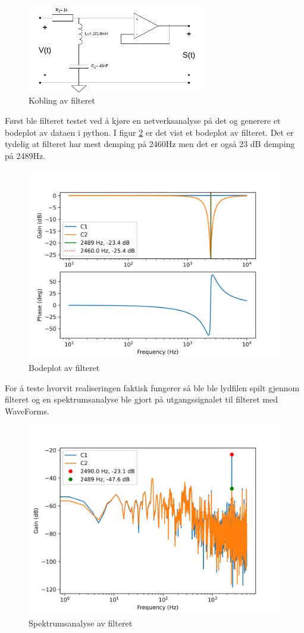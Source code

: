 \begin{figure}[!h]
	\centering
	\includegraphics[width=0.7\textwidth]{Bilder/RLC_filter.drawio.png}
	\caption{Kobling av filteret}
	\label{fig:fig5}
\end{figure}


Først ble filteret testet ved å kjøre en netverksanalyse på det og generere et bodeplot av dataen i python. I figur \ref{fig:fig6} er det vist et bodeplot av filteret. Det er tydelig at filteret har mest demping på 2460Hz men det er også 23 dB demping på 2489Hz. 

\begin{figure}[!h]
	\centering
	\includegraphics[width=1\textwidth]{Bilder/bode1K.png}
	\caption{Bodeplot av filteret}
	\label{fig:fig6}
\end{figure}

For å teste hvorvit realiseringen faktisk fungerer så ble ble lydfilen spilt gjennom filteret og en spektrumsanalyse ble gjort på utgangssignalet til filteret med WaveForms. 

\begin{figure}[!h]
	\centering
	\includegraphics[width=1\textwidth]{Bilder/spectrum2K.png}
	\caption{Spektrumsanalyse av filteret}
	\label{fig:fig7}
\end{figure}

